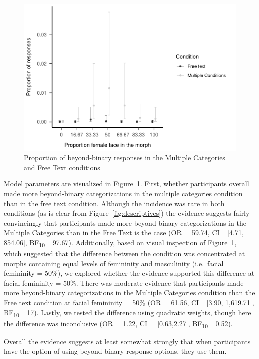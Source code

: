 \documentclass[
  man]{apa7}
\begin{document}
\begin{figure}
\centering
\includegraphics{resp_opts_manus23022_files/figure-latex/exp-one-inf-1.pdf}
\caption{\label{fig:exp-one-inf}Proportion of beyond-binary responses in the Multiple Categories and Free Text conditions}
\end{figure}

Model parameters are visualized in Figure~\ref{fig:exp-one-inf}. First, whether participants overall made more beyond-binary categorizations in the multiple categories condition than in the free text condition. Although the incidence was rare in both conditions (as is clear from Figure~\ref{fig:descriptives}) the evidence suggests fairly convincingly that participants made more beyond-binary categorizations in the Multiple Categories than in the Free Text is the case (OR = 59.74, CI ={[}4.71, 854.06{]}, BF\textsubscript{10}= 97.67). Additionally, based on visual inspection of Figure~\ref{fig:exp-one-inf}, which suggested that the difference between the condition was concentrated at morphs containing equal levels of femininity and masculinity (i.e.~facial femininity = 50\%), we explored whether the evidence supported this difference at facial femininity = 50\%. There was moderate evidence that participants made more beyond-binary categorizations in the Multiple Categories condition than the Free text condition at facial femininity = 50\% (OR = 61.56, CI ={[}3.90, 1,619.71{]}, BF\textsubscript{10}= 17). Lastly, we tested the difference using quadratic weights, though here the difference was inconclusive (OR = 1.22, CI = {[}0.63,2.27{]}, BF\textsubscript{10}= 0.52).

Overall the evidence suggests at least somewhat strongly that when participants have the option of using beyond-binary response options, they use them.
\end{document}
